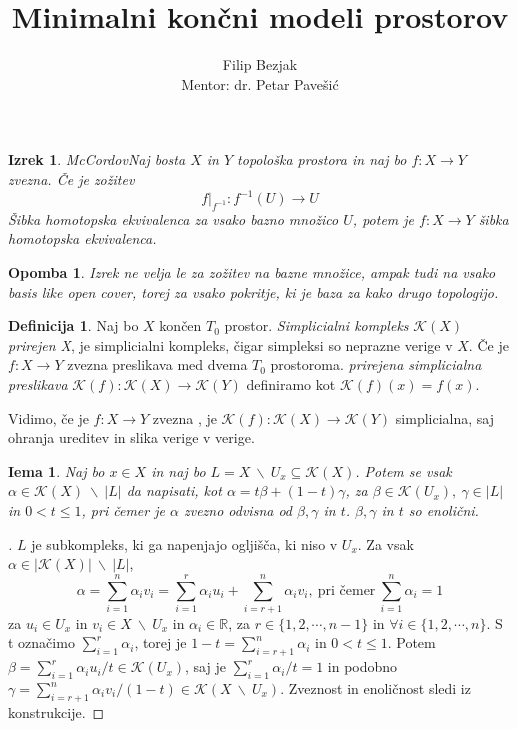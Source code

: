 \documentclass[a4paper,12pt]{article}
\title{Minimalni končni modeli prostorov}
\author{Filip Bezjak \\ Mentor: dr. Petar Pavešić}
\DeclareRobustCommand{\k}{
    \mathcal{K}
}
\theoremstyle{definition}
\newtheorem{definicija}{Definicija}
\theoremstyle{plain}
\newtheorem{izrek}{Izrek}
\theoremstyle{plain}
\theoremstyle{plain}
\theoremstyle{plain}
\newtheorem{opomba}{Opomba}
\theoremstyle{plain}
\newtheorem{lema}{Iema}
\newenvironment{dokaz}{\begin{proof}[\bfseries\upshape\proofname]}{\end{proof}}
\begin{document}
\maketitle


\begin{izrek}{McCordov}\label{iz:mccord}
    Naj bosta $X$ in $Y$ topološka prostora in naj bo $f:X\rightarrow Y$ zvezna. Če je zožitev
    $$
    f|_{f^{-1}}:f^{-1}(U)\rightarrow U
    $$
    Šibka homotopska ekvivalenca za vsako bazno množico $U$, potem je $f:X\rightarrow Y$  šibka homotopska ekvivalenca.
\end{izrek}

\begin{opomba}
    Izrek ne velja le za zožitev na bazne množice, ampak tudi na vsako \textit{basis like open cover}, torej za vsako pokritje, ki je baza za kako drugo topologijo.
\end{opomba}

\begin{definicija}
    Naj bo $X$ končen $T_0$ prostor. \textit{Simplicialni kompleks} $\mathcal{K}(X)$ \textit{prirejen X}, je simplicialni kompleks, čigar simpleksi so neprazne verige v $X$. Če je $f: X\rightarrow Y$ zvezna preslikava med dvema $T_0$ prostoroma. \textit{prirejena simplicialna preslikava} $\mathcal{K}(f):\mathcal{K}(X) \rightarrow \mathcal{K}(Y)$ definiramo kot $\mathcal{K}(f)(x) = f(x)$.
\end{definicija}

Vidimo, če je $f: X\rightarrow Y$ zvezna , je $\mathcal{K}(f):\mathcal{K}(X) \rightarrow \mathcal{K}(Y)$ simplicialna, saj ohranja ureditev in slika verige v verige.

\begin{lema}\label{lem:sibka}
    Naj bo $x\in X$ in naj bo $L=X\ \backslash \
    U_x\subseteq \mathcal{K}(X)$. Potem se vsak $\alpha \in \k(X)\ \backslash \ |L|$ da napisati, kot $\alpha = t\beta + (1-t)\gamma$, za $\beta \in \k(U_x), \ \gamma \in |L|$ in $0<t\leq 1$, pri čemer je $\alpha$ zvezno odvisna od $\beta, \gamma$ in $t$. $\beta, \gamma$ in $t$ so enolični.
\end{lema}
\begin{dokaz}
    $L$ je subkompleks, ki ga napenjajo ogljišča, ki niso v $U_x$. Za vsak $\alpha \in |\k(X)|\ \backslash \ |L|$, 
    $$\alpha = \sum_{i=1}^{n} \alpha_i v_i 
    = \sum_{i=1}^{r} \alpha_i u_i + \sum_{i=r+1}^{n}\alpha_i v_i,\ \text{pri čemer}\ \sum_{i=1}^{n} \alpha_i=1
    $$
    za $u_i \in U_x$ in $v_i \in X \ \backslash \ U_x$ in $\alpha_i \in \mathbb{R}$, za $r\in \{1,2, \cdots, n-1\}$ in $\forall i \in \{1,2, \cdots, n\}$. S t označimo $\sum_{i=1}^{r} \alpha_i$, torej je $1-t=\sum_{i=r+1}^{n} \alpha_i$ in $0<t\leq 1$. Potem $\beta =\sum_{i=1}^{r} \alpha_i u_i/t \in \k(U_x)$, saj je $\sum_{i=1}^{r} \alpha_i/t=1$ in podobno $\gamma=\sum_{i=r+1}^{n} 
    \alpha_i v_i/(1-t) \in \k(X \ \backslash \ U_x)$. Zveznost in enoličnost sledi iz konstrukcije.

\end{dokaz}
\end{document}
